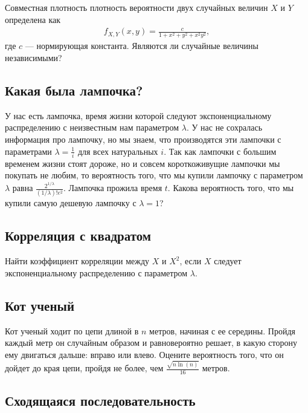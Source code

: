 \documentclass[12pt]{article}
\begin{document}
Совместная плотность плотность вероятности двух случайных величин $X$ и $Y$ определена как
\begin{align*}
    f_{X, Y}(x, y) = \frac{c}{1 + x^2 + y^2 + x^2y^2},
\end{align*}
где $c$ --- нормирующая константа. Являются ли случайные величины независимыми?



\subsection{Какая была лампочка?}

У нас есть лампочка, время жизни которой следуют экспоненциальному распределению с неизвестным нам параметром $\lambda$. У нас не сохралась информация про лампочку, но мы знаем, что производятся эти лампочки с параметрами $\lambda = \frac{1}{i}$ для всех натуральных $i$. Так как лампочки с большим временем жизни стоят дороже, но и совсем короткоживущие лампочки мы покупать не любим, то вероятность того, что мы купили лампочку с параметром $\lambda$ равна $\frac{2^{1/\lambda}}{(1/\lambda)!e^2}$. Лампочка прожила время $t$. Какова вероятность того, что мы купили самую дешевую лампочку с $\lambda = 1$?




\subsection{Корреляция с квадратом}

Найти коэффициент корреляции между $X$ и $X^2$, если $X$ следует экспоненциальному распределению с параметром $\lambda$.



\subsection{Кот ученый}

Кот ученый ходит по цепи длиной в $n$ метров, начиная с ее середины. Пройдя каждый метр он случайным образом и равновероятно решает, в какую сторону ему двигаться дальше: вправо или влево. Оцените вероятность того, что он дойдет до края цепи, пройдя не более, чем $\frac{\sqrt{n \ln(n)}}{16}$ метров.



\subsection{Сходящаяся последовательность}
\end{document}
